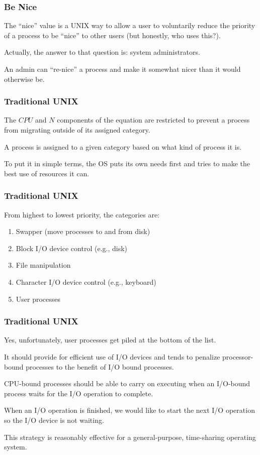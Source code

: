 \begin{frame}
\frametitle{Be Nice}

The ``nice'' value is a UNIX way to allow a user to voluntarily reduce the priority of a process to be ``nice'' to other users (but honestly, who uses this?).

Actually, the answer to that question is: system administrators. 

An admin can ``re-nice'' a process and make it somewhat nicer than it would otherwise be.


\end{frame}

\begin{frame}
\frametitle{Traditional UNIX}

The $CPU$ and $N$ components of the equation are restricted to prevent a process from migrating outside of its assigned category. 

A process is assigned to a given category based on what kind of process it is. 

To put it in simple terms, the OS puts its own needs first and tries to make the best use of resources it can.


\end{frame}

\begin{frame}
\frametitle{Traditional UNIX}

From highest to lowest priority, the categories are:

\begin{enumerate}
	\item Swapper (move processes to and from disk)
	\item Block I/O device control (e.g., disk)
	\item File manipulation
	\item Character I/O device control (e.g., keyboard)
	\item User processes
\end{enumerate}



\end{frame}

\begin{frame}
\frametitle{Traditional UNIX}

Yes, unfortunately, user processes get piled at the bottom of the list. 

It should provide for efficient use of I/O devices and tends to penalize processor-bound processes to the benefit of I/O bound processes. 

CPU-bound processes should be able to carry on executing when an I/O-bound process waits for the I/O operation to complete. 

When an I/O operation is finished, we would like to start the next I/O operation so the I/O device is not waiting.

This strategy is reasonably effective for a general-purpose, time-sharing operating system.

\end{frame}


